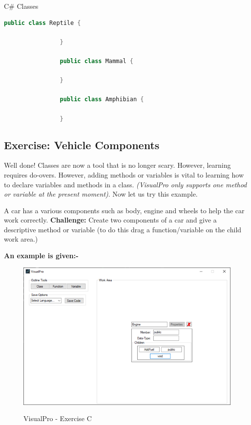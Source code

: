 \documentclass[10pt]{article}
\begin{document}
        \begin{example}{C\# Classes}
            \begin{lstlisting}[language=java]
                public class Reptile {

                }

                public class Mammal {

                }

                public class Amphibian {

                }
            \end{lstlisting}
        \end{example}

    \newpage
    \subsection{Exercise: Vehicle Components}
    Well done! Classes are now a tool that is no longer scary. However, learning requires do-overs. However, adding methods or variables is vital to learning how to declare variables and methods in a class. \textit{(VisualPro only supports one method or variable at the present moment)}. Now let us try this example.

    A car has a various components such as body, engine and wheels to help the car work correctly. \textbf{Challenge:} Create two components of a car and give a descriptive method or variable (to do this drag a function/variable on the child work area.)

    \textbf{An example is given:-}
    \begin{figure}[h]
        \centering
        {\includegraphics[scale=0.75]{Figures/Exercises/SecD-1.png}}
        \caption{VisualPro - Exercise C}
        \label{fig:vp-eC}
    \end{figure}
\end{document}
